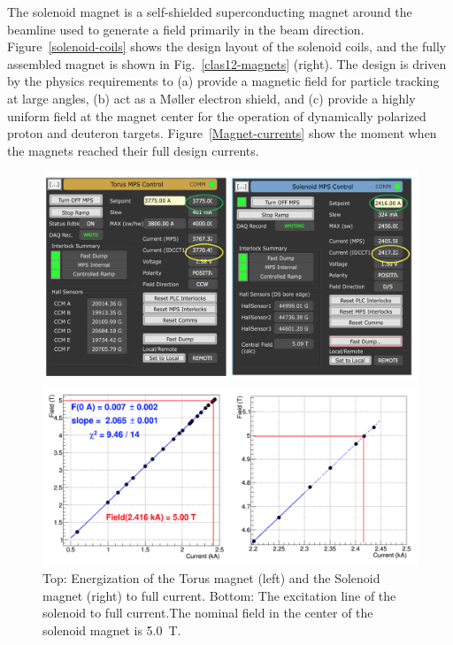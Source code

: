 \documentclass[final,3p,twocolumn]{elsarticle}
\begin{document}
The solenoid magnet is a self-shielded superconducting magnet around the beamline used to generate a field
primarily in the beam direction. Figure~\ref{solenoid-coils} shows the design layout of the solenoid coils, and the
fully assembled magnet is shown in Fig.~\ref{clas12-magnets} (right). The design is driven by the physics
requirements to (a) provide a magnetic field for particle tracking at large angles, (b) act as a M{\o}ller electron
shield, and (c) provide a highly uniform field at the magnet center for the operation of dynamically polarized
proton and deuteron targets.
Figure~\ref{Magnet-currents} show the moment when the magnets reached their full design currents.   
\begin{figure}[tb!]
\centerline{\includegraphics[width=1.0\columnwidth]{Magnets-currents.png}}
\centerline{\includegraphics[width=1.0\columnwidth]{Solenoid-current.png}}
\caption{Top: Energization of the Torus magnet (left) and the Solenoid magnet (right) to full current. Bottom: The 
excitation line of the solenoid to full current.The nominal field in the center of the solenoid magnet is 5.0~T.}
\label{Magnets-currents}
\end{figure}
\end{document}
